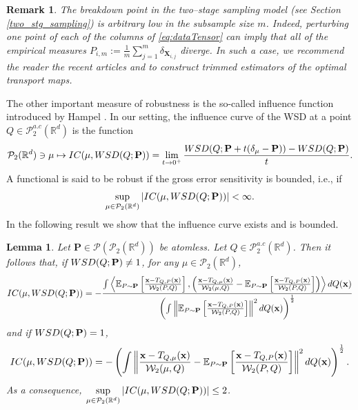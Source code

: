 \documentclass{imsart}
\newtheorem {Lemma}[Proposition] {Lemma}
\newtheorem {Remark}[Proposition]{Remark}
\numberwithin{equation}{section}
\def\R{\mathbb{R}}
\def\E{\mathbb{E}}
\def\x{\mathbf{x}}
\def\X{\mathbf{X}}
\def\E{\mathbb E}
\def\x{\mathbf x}
\begin{document}
\begin{Remark}
	The breakdown point in the two--stage sampling model (see Section \ref{two_stg_sampling}) is arbitrary low in the subsample size $m$. Indeed, perturbing  one point of each of the columns of \eqref{eq:dataTensor} can imply that all of the empirical measures   $P_{i,m}:=\frac{1}{m}\sum_{j=1}^m\delta_{\X_{i,j} }$ diverge. In such a case, we recommend the reader the recent articles \cite{AvellaGonzalezSanz.2024} and \cite{paindaveine.2024.robustnesssemidiscreteoptimaltransport} to construct trimmed estimators of the optimal transport maps.  
\end{Remark}
The other important measure of robustness is the so-called influence function introduced by  Hampel \citep{Hampel1974infuence}. In our setting, the influence curve of the WSD at a point $Q \in  \mathcal{P}^{a.c}_2(\R^d) $ is the function 
$$\mathcal{P}_2(\R^d) \ni  \mu\mapsto  {\rm IC}( \mu, { \rm WSD}(Q;{\bf P} )) =\lim_{t\to 0^+}\frac{{ \rm WSD}(Q;{\bf P}+ t(\delta_\mu-{\bf P}) )- { \rm WSD}(Q;{\bf P} ) }{t}.$$
A functional is said to be robust if the gross error sensitivity is bounded, i.e., if 
$$ \sup_{\mu
	\in \mathcal{P}_2(\R^d)
} |{\rm IC}( \mu, {\rm WSD}(Q;{\bf P} ))| <\infty. $$
In the following result we show that the influence curve exists and is bounded. 
\begin{Lemma}\label{lemma:influence}
	Let  $\mathbf{P}\in \mathcal{P}(\mathcal{P}_2(\R^d)) $ be atomless.
	Let $Q\in  \mathcal{P}^{a.c}_2(\R^d)$.
	Then it follows that, if  ${\rm WSD}(Q;{\bf P})\neq 1$, 
	for any $\mu \in \mathcal{P}_2(\R^d)$,
	$${\rm IC}( \mu, {\rm WSD}(Q;{\bf P} ))= -\frac{\int
		\left\langle
		\E_{P\sim \mathbf{P}}\left[  \frac{\x-T_{Q,P}(\x) }{\mathcal{W}_2(P,Q)}\right],
		\left(  \frac{\x-T_{Q,\mu}(\x) }{\mathcal{W}_2(\mu,Q)}- \E_{P\sim \mathbf{P}}\left[  \frac{\x-T_{Q,P}(\x)  }{\mathcal{W}_2(P,Q)}\right] \right)
		\right\rangle
		dQ(\x)}{\left( \int \left\| \E_{P\sim \mathbf{P}}\left[  \frac{\x-T_{Q,P}(\x) }{\mathcal{W}_2(P,Q)}\right] \right\|^2 dQ(\x) \right)^{\frac{1}{2}}}  $$
	and if   ${\rm WSD}(Q;{\bf P})=1$,
	$${\rm IC}( \mu, {\rm WSD}(Q;{\bf P} ))= -\left(\int  \left\|  \frac{\x-T_{Q,\mu}(\x) }{\mathcal{W}_2(\mu,Q)}- \E_{P\sim \mathbf{P}}\left[  \frac{\x-T_{Q,P}(\x)  }{\mathcal{W}_2(P,Q)}\right] \right\|^2 dQ(\x)\right)^{\frac{1}{2}} . $$
	As a consequence, 
	$\displaystyle \sup_{\mu \in 
		\mathcal{P}_2(\R^d)   
	} |{\rm IC}( \mu, {\rm WSD}(Q;{\bf P} ))| \leq 2$. 
\end{Lemma}
\end{document}
